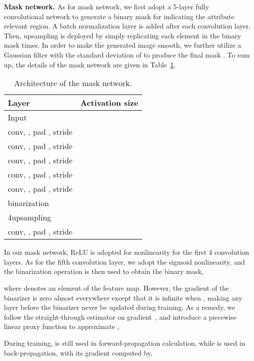 \documentclass[journal]{IEEEtran}
\begin{document}
\textbf{Mask network.}
As for mask network, we first adopt a 5-layer fully convolutional network to generate a  binary mask for indicating the attribute relevant region.
A batch normalization layer is added after each convolution layer.
Then,  upsampling is deployed by simply replicating each element in the  binary mask  times.
In order to make the generated image smooth, we further utilize a  Gaussian filter with the standard deviation of  to produce the final mask .
To sum up, the details of the mask network are given in Table~\ref{table:mask}.







\begin{table}[htb]
\footnotesize
\caption{Architecture of the mask network.}
\begin{center}
\begin{tabular}{l|c}
\hline
Layer&  Activation size  \\
\hline
Input&  \\
conv, , pad , stride  &  \\
conv, , pad , stride  &  \\
conv, , pad , stride  &  \\
conv, , pad , stride  &  \\
conv, , pad , stride  &  \\
binarization\\
4upsampling & \\
conv, , pad , stride  &
\\
\hline
\end{tabular}
\end{center}
\label{table:mask}
\end{table}


In our mask network, ReLU is adopted for nonlinearity for the first 4 convolution layers.
As for the fifth convolution layer, we adopt the sigmoid nonlinearity, and the binarization operation is then used to obtain the binary mask,

where  denotes an element of the feature map.
However, the gradient of the binarizer  is zero almost everywhere except that it is infinite when ,
making any layer before the binarizer never be updated during training.
As a remedy, we follow the straight-through estimator on gradient~\cite{courbariaux2016binarized}, and introduce a piecewise linear proxy function  to approximate ,

During training,  is still used in forward-propagation calculation, while  is used in back-propagation, with its gradient computed by,
\end{document}
